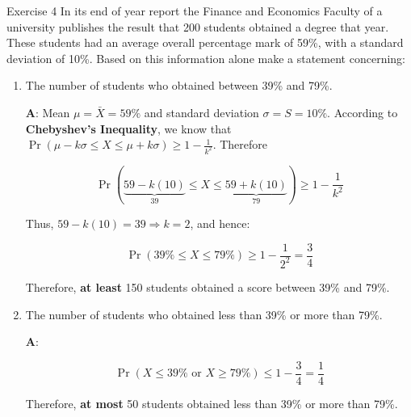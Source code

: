 \documentclass[
  ignorenonframetext,
  aspectratio=43,
]{beamer}
\let\olditem\item
\renewcommand\item{\olditem\justifying}
\begin{document}
\begin{frame}{Exercise 4}
\protect\hypertarget{exercise-4}{}
In its end of year report the Finance and Economics Faculty of a
university publishes the result that 200 students obtained a degree that
year. These students had an average overall percentage mark of 59\%,
with a standard deviation of 10\%. Based on this information alone make
a statement concerning:
\end{frame}

\begin{frame}{}
\protect\hypertarget{section-7}{}
\begin{enumerate}
\item
  The number of students who obtained between 39\% and 79\%.

  \textbf{A}: Mean \(\mu = \bar{X} = 59\%\) and standard deviation
  \(\sigma = S = 10\%\). According to \textbf{Chebyshev’s Inequality},
  we know that
  \(\Pr(\mu - k\sigma \le X \le \mu + k\sigma) \ge 1 - \frac{1}{k^2}\).
  Therefore \vspace{-7pt}

  \[
   \Pr(\underbrace{59 - k(10)}_{39} \le X \le \underbrace{59 + k(10)}_{79}) \ge 1 - \frac{1}{k^2}
   \]

  Thus, \(59 - k(10) = 39 \Rightarrow k = 2\), and hence: \vspace{-7pt}

  \[
   \Pr(39\% \le X \le 79\%) \ge 1 - \frac{1}{2^2} = \frac{3}{4}
   \]

  Therefore, \textbf{at least} 150 students obtained a score between
  39\% and 79\%.
\end{enumerate}
\end{frame}

\begin{frame}{}
\protect\hypertarget{section-8}{}
\begin{enumerate}
\setcounter{enumi}{1}
\item
  The number of students who obtained less than 39\% or more than 79\%.

  \textbf{A}: \vspace{-12pt}

  \[
   \Pr(X \le 39\% \text{ or } X \ge 79\%) \le 1 - \frac{3}{4} = \frac{1}{4}
   \]

  Therefore, \textbf{at most} 50 students obtained less than 39\% or
  more than 79\%.
\end{enumerate}
\end{frame}
\end{document}

